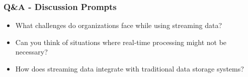 \documentclass[aspectratio=169]{beamer}
\begin{document}
\begin{frame}[fragile]
    \frametitle{Q\&A - Discussion Prompts}
    \begin{itemize}
        \item What challenges do organizations face while using streaming data?
        \item Can you think of situations where real-time processing might not be necessary?
        \item How does streaming data integrate with traditional data storage systems?
    \end{itemize}
\end{frame}
\end{document}
